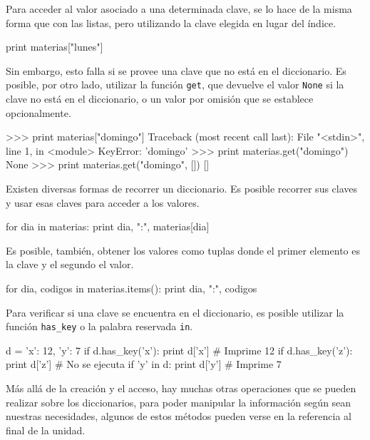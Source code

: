 Para acceder al valor asociado a una determinada clave, se lo hace
de la misma forma que con las listas, pero utilizando la clave
elegida en lugar del índice.

\begin{codigo-python-sn}
print materias["lunes"]
\end{codigo-python-sn}

Sin embargo, esto falla si se provee una clave que no está en el diccionario.
Es posible, por otro lado, utilizar la función \lstinline{get}, que devuelve el
valor \lstinline{None} si la clave no está en el diccionario, o un valor por
omisión que se establece opcionalmente.

\begin{codigo-python-sn}
>>> print materias["domingo"]
Traceback (most recent call last):
  File "<stdin>", line 1, in <module>
KeyError: 'domingo'
>>> print materias.get("domingo")
None
>>> print materias.get("domingo", [])
[]
\end{codigo-python-sn}

Existen diversas formas de recorrer un diccionario.  Es posible recorrer
sus claves y usar esas claves para acceder a los valores.

\begin{codigo-python-sn}
for dia in materias:
    print dia, ":", materias[dia]
\end{codigo-python-sn}

Es posible, también, obtener los valores como tuplas donde el primer
elemento es la clave y el segundo el valor.

\begin{codigo-python-sn}
for dia, codigos in materias.items():
    print dia, ":", codigos
\end{codigo-python-sn}

Para verificar si una clave se encuentra en el diccionario, es posible
utilizar la función \lstinline{has_key} o la palabra reservada
\lstinline{in}.

\begin{codigo-python-sn}
d = {'x': 12, 'y': 7}
if d.has_key('x'):
    print d['x']   # Imprime 12
if d.has_key('z'): 
    print d['z']   # No se ejecuta
if 'y' in d:
    print d['y']   # Imprime 7
\end{codigo-python-sn}

Más allá de la creación y el acceso, hay muchas otras operaciones que se
pueden realizar sobre los diccionarios, para poder manipular la información
según sean nuestras necesidades, algunos de estos métodos pueden verse en
la referencia al final de la unidad.

